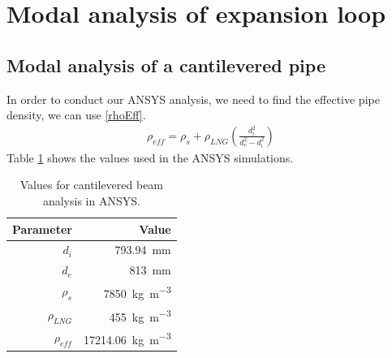 \section{Modal analysis of expansion loop}
\subsection{Modal analysis of a cantilevered pipe}
In order to conduct our ANSYS analysis, we need to find the effective pipe density, we can use \eqref{rhoEff}.
\begin{gather}\label{rhoEff}
    \rho_{eff} = \rho_s + \rho_{LNG}\left(\frac{d_i^2}{d_e^2 - d_i^2}\right)
\end{gather}
Table \ref{modalParams} shows the values used in the ANSYS simulations.
\begin{table}[H]
    \centering
    \begin{tabular}{@{}rr@{}}
        \toprule
        \textbf{Parameter} & \textbf{Value}                            \\
        \midrule
        $d_i$              & \SI{793.94}{\milli\meter}                 \\
        $d_e$              & \SI{813}{\milli\meter}                    \\
        $\rho_s$           & \SI{7850}{\kilo\gram\per\meter\cubed}     \\
        $\rho_{LNG}$       & \SI{455}{\kilo\gram\per\meter\cubed}      \\
        $\rho_{eff}$       & \SI{17214.06}{\kilo\gram\per\meter\cubed} \\
        \bottomrule
    \end{tabular}
    \caption{Values for cantilevered beam analysis in ANSYS.}
    \label{modalParams}
\end{table}

